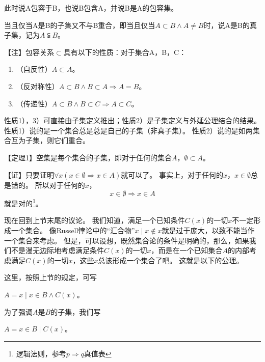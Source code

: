 此时说A包容于B，也说B包含A，并说B是A的包容集。

当且仅当A是B的子集又不与B重合，即当且仅当$A \subset B \land A \neq B$时，说A是B的真子集，记为$A \subsetneqq B$。

【注】包容关系$\subset$具有以下的性质：对于集合A，B，C：
\begin{enumerate}[label=\arabic*）,itemindent=2em]
\item （自反性）$A \subset A$。
\item （反对称性）$A \subset B \land B \subset A \Rightarrow A = B$。
\item （传递性）$A \subset B \land B \subset C \Rightarrow A \subset C$。
\end{enumerate}

性质1），3）可直接由子集定义推出；性质2）是子集定义与外延公理结合的结果。
性质1）说的是一个集合总是总是自己的子集（非真子集）。
性质2）说的是如两集合互为子集，则它们重合。

【定理1】空集是每个集合的子集，即对于任何的集合$A$，$\emptyset \subset A$。

【证】只要证明$\forall x (x \in \emptyset \Rightarrow x \in A)$就可以了。
事实上，对于任何的$x$，$x \in \emptyset$总是错的。
所以对于任何的$x$，
$$x \in \emptyset \Rightarrow x \in A$$
就是对的\footnote{逻辑法则，参考$p \Rightarrow q$真值表}。

现在回到上节末尾的议论。
我们知道，满足一个已知条件$C(x)$的一切$x$不一定形成一个集合。
像Russell悖论中的“汇合物”${x \mid x \notin x}$就是过于庞大，以致不能当作一个集合来考虑。
但是，可以设想，既然集合论的条件是明确的，那么，如果我们不是漫无边际地考虑满足条件$C(x)$的一切$x$，而是在一个已知集合$A$的内部考虑满足$C(x)$的一切$x$，这些$x$总该形成一个集合了吧。
这就是以下的公理。


这里，按照上节的规定，可写
\begin{center}
$A={x \mid x \in B \land C(x)}$。
\end{center}
为了强调$A$是$B$的子集，我们写
    \begin{center}
$A={x \in B \mid C(x)}$。
\end{center}

